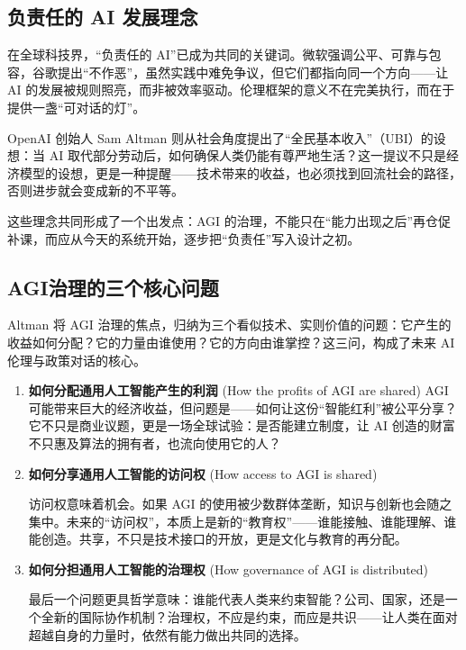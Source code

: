 \subsection{负责任的 AI 发展理念}

在全球科技界，“负责任的 AI”已成为共同的关键词。微软强调公平、可靠与包容，谷歌提出“不作恶”，虽然实践中难免争议，但它们都指向同一个方向——让 AI 的发展被规则照亮，而非被效率驱动。伦理框架的意义不在完美执行，而在于提供一盏“可对话的灯”。

OpenAI 创始人 Sam Altman 则从社会角度提出了“全民基本收入”（UBI）的设想：当 AI 取代部分劳动后，如何确保人类仍能有尊严地生活？这一提议不只是经济模型的设想，更是一种提醒——技术带来的收益，也必须找到回流社会的路径，否则进步就会变成新的不平等。

这些理念共同形成了一个出发点：AGI 的治理，不能只在“能力出现之后”再仓促补课，而应从今天的系统开始，逐步把“负责任”写入设计之初。

\subsection{AGI治理的三个核心问题}

Altman 将 AGI 治理的焦点，归纳为三个看似技术、实则价值的问题：它产生的收益如何分配？它的力量由谁使用？它的方向由谁掌控？这三问，构成了未来 AI 伦理与政策对话的核心。

\begin{enumerate}
\item {\bf 如何分配通用人工智能产生的利润} (How the profits of AGI are shared)
AGI 可能带来巨大的经济收益，但问题是——如何让这份“智能红利”被公平分享？它不只是商业议题，更是一场全球试验：是否能建立制度，让 AI 创造的财富不只惠及算法的拥有者，也流向使用它的人？

\item {\bf 如何分享通用人工智能的访问权} (How access to AGI is shared)

访问权意味着机会。如果 AGI 的使用被少数群体垄断，知识与创新也会随之集中。未来的“访问权”，本质上是新的“教育权”——谁能接触、谁能理解、谁能创造。共享，不只是技术接口的开放，更是文化与教育的再分配。

\item {\bf 如何分担通用人工智能的治理权} (How governance of AGI is distributed)

最后一个问题更具哲学意味：谁能代表人类来约束智能？公司、国家，还是一个全新的国际协作机制？治理权，不应是约束，而应是共识——让人类在面对超越自身的力量时，依然有能力做出共同的选择。
\end{enumerate}

